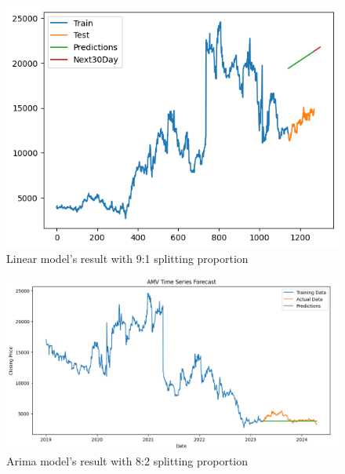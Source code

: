 \documentclass{ieeeojies}
\begin{document}
\begin{figure}[H]
  \centering
  \begin{minipage}{0.8\linewidth}
    \centering
    \includegraphics[width=\linewidth]{bibliography/Figure/LN_AMV91.png}
    \caption{Linear model's result with 9:1 splitting proportion}
    \label{fig8}
  \end{minipage}
\end{figure}

\begin{figure}[H]
  \centering
  \begin{minipage}{0.8\linewidth}
    \centering
    \includegraphics[width=\linewidth]{bibliography/Figure/AMV_ARIMA.png}
    \caption{Arima model's result with 8:2 splitting proportion}
    \label{fig8}
  \end{minipage}
\end{figure}
\end{document}
